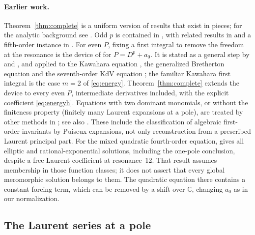 \paragraph{Earlier work.}
Theorem~\ref{thm:complete} is a uniform version of results that exist in
pieces; for the analytic background see \citet{Eremenko1982}. Odd \(p\)
is contained in \citet[Theorem~1]{YuanLiQi2014}, with related results in
\citet{HuangZhangChenYuan2014,YuanWuChenHuang2014} and a fifth-order
instance in \citet{Dang2023Odd}. For even \(P\), fixing a first integral
to remove the freedom at the resonance is the device of
\citet[Lemmas~3--4]{EremenkoLiaoNg2009} for \(P=D^p+a_0\). It is stated
as a general step by \citet[Section~3.2]{ConteNgWu2018} and
\citet[Section~5]{ConteMusetteNgWu2025}, and applied to the Kawahara
equation \citep{DeminaKudryashovKawahara2010,YeEtAl2022}, the
generalized Bretherton equation
\citep{DeminaKudryashov2011,KudryashovSinelshchikovDemina2011} and the
seventh-order KdV equation \citep{Dang2023Even}; the familiar Kawahara
first integral is the case \(m=2\) of \eqref{eq:energy}.
Theorem~\ref{thm:complete} extends the device to every even \(P\),
intermediate derivatives included, with the explicit coefficient
\eqref{eq:energyh}. Equations with two dominant monomials, or without
the finiteness property (finitely many Laurent expansions at a pole),
are treated by other methods in \citet{Demina2019,Demina2022}; see
also \citet[Sections~5.2--5.3]{BelovaThesis}. These include the
classification of algebraic first-order invariants by Puiseux
expansions, not only reconstruction from a prescribed Laurent
principal part. For the mixed quadratic fourth-order equation,
\citet[Section~5.6, Theorem~5.8]{BelovaThesis} gives all elliptic
and rational-exponential solutions, including the one-pole
conclusion, despite a free Laurent coefficient at resonance~12.
That result assumes membership in those function classes; it does
not assert that every global meromorphic solution belongs to them.
The quadratic equation there contains a constant forcing term,
which can be removed by a shift over \(\mathbb C\), changing
\(a_0\) as in our normalization.

\subsection{The Laurent series at a pole}

